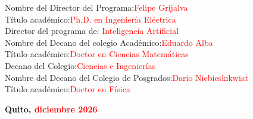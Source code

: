 \begin{customfontsize}
    Nombre del Director del Programa:\hspace{3cm}\textcolor{red} {Felipe Grijalva}\\
    Título académico:\hspace{6.2cm}\textcolor{red}{Ph.D. en Ingeniería Eléctrica}\\
    Director del programa de:\hspace{4.7cm}\textcolor{red}{ Inteligencia Artificial}
    \vspace{30pt}
    \\Nombre del Decano del colegio Académico:\hspace{1.6cm}\textcolor{red}{Eduardo Alba}\\
    Título académico:\hspace{6.2cm}\textcolor{red}{Doctor en Ciencias Matemáticas}\\
    Decano del Colegio:\hspace{5.8cm}\textcolor{red}{Ciencias e Ingenierías}
    \vspace{30pt}
    \\Nombre del Decano del Colegio de Posgrados:\hspace{1cm}\textcolor{red}{Dario Niebieskikwiat}\\
    Título académico:\hspace{6.1cm}\textcolor{red}{Doctor en Física}

\end{customfontsize}

\begin{center}
    \vspace{350pt}
    \textbf{\fontsize{14}{16}\selectfont Quito, \textcolor{red}{diciembre 2026}}
\end{center}
